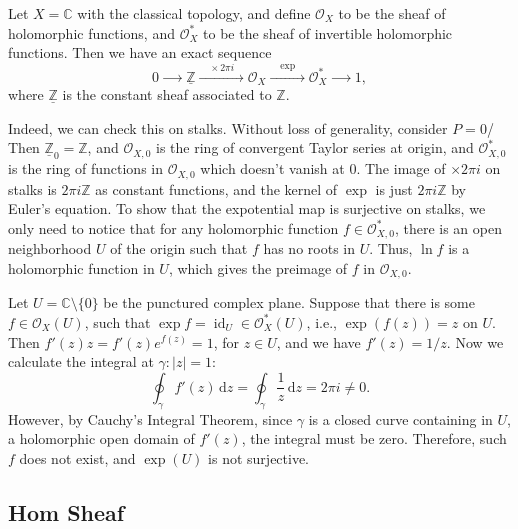\documentclass[11pt]{article}
\newcommand{\id}{\operatorname{id}}
\begin{document}
\begin{example}
  \cite[Example 2.4.10]{vakilTheRisingSea}
  Let $X=\mathbb{C}$ with the classical topology, 
  and define $\mathscr{O}_{X}$ to be the sheaf of holomorphic functions, 
  and $\mathscr{O}_{X}^{*}$ to be the sheaf of invertible holomorphic functions. 
  Then we have an exact sequence 
  $$0 \xrightarrow{\quad \quad} \underline{\mathbb{Z}} 
  \xrightarrow{\quad \times 2 \pi i \quad} \mathscr{O}_{X} 
  \xrightarrow{\quad \mathrm{exp} \quad} \mathscr{O}_{X}^{*} 
  \xrightarrow{\quad  \quad}1,$$
  where $\underline{\mathbb{Z}}$ is the constant sheaf associated to $\mathbb{Z}$. 

  Indeed, we can check this on stalks. Without loss of generality, consider $ P=0 $/ 
  Then $ \underline{\mathbb{Z}}_{0} = \mathbb{Z} $, 
  and $ \mathscr{O}_{X,0} $ is the ring of convergent Taylor series at origin, 
  and $ \mathscr{O}_{X,0}^{*} $ is the ring of functions in $  \mathscr{O}_{X,0} $ 
  which doesn't vanish at $ 0 $. The image of $ \times 2 \pi i $ on stalks 
  is $ 2 \pi i \mathbb{Z}$ as constant functions, and the kernel of $ \exp $ is just 
  $ 2 \pi i \mathbb{Z} $ by Euler's equation. 
  To show that the expotential map is surjective on stalks, we only need to notice that 
  for any holomorphic function $ f \in \mathscr{O}_{X,0}^{*} $, 
  there is an open neighborhood $ U $ of the origin such that $ f $ has no roots in $ U $. 
  Thus, $ \ln f $ is a holomorphic function in $ U $, which gives the preimage of $ f $ 
  in $ \mathscr{O}_{X,0} $. 

  Let $ U = \mathbb{C} \setminus \{0\} $ be the punctured complex plane. 
  Suppose that there is some $ f \in \mathscr{O}_{X}(U) $, such that 
  $ \exp f = \id_{U} \in \mathscr{O}_{X}^{*}(U)$, i.e., $ \exp(f(z))=z $ on $ U $. 
  Then $ f'(z)z = f'(z) e^{f(z)} = 1 $, for $ z \in U $, and we have $ f'(z) = 1/z $. 
  Now we calculate the integral at 
  $\gamma:|z|=1$: 
  $$\oint_{\gamma} f'(z) \,\mathrm{d}z = \oint_{\gamma} \frac{1}{z} \,
  \mathrm{d}z =2 \pi i  \neq 0.$$
  However, by Cauchy's Integral Theorem, since $\gamma$ is a closed curve 
  containing in $U$, a holomorphic open domain of $f'(z)$, 
  the integral must be zero. 
  Therefore, such $f$ does not exist, and $\exp(U)$ is not surjective. 
\end{example}

\subsection{Hom Sheaf}
\end{document}

